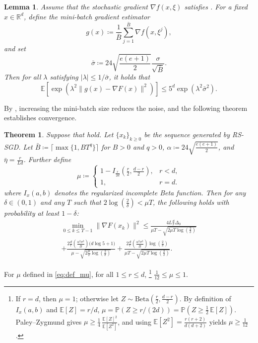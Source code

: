 \documentclass[10pt]{article}
\newtheorem{theorem}{Theorem}[section]
\newtheorem{lemma}[lemma]{Lemma}
\begin{document}
\begin{lemma}\label{lem:subgauss_minibatch}
Assume that the stochastic gradient  $\nabla f(x,\xi)$ satisfies
.
For a fixed $x \in \mathbb{R}^d$, define the mini-batch gradient estimator
\[
g(x) \coloneqq \frac{1}{\bar{B}} \sum_{j=1}^{\bar{B}} \nabla f(x,\xi^j),
\]
and set
\[
\bar{\sigma} \coloneqq 
24\sqrt{\frac{e(e+1)}{2}}\frac{\sigma}{\sqrt{\bar{B}}}.
\]
Then for all $\lambda$ satisfying $|\lambda| \le 1/\bar{\sigma}$, it holds that
\[
\mathbb{E}\!\left[
\exp\!\left(\lambda^2 \bigl\|g(x) - \nabla F(x)\bigr\|^2\right)
\right]
\le
5^d \exp\!\left(\lambda^2 \bar{\sigma}^2\right).
\]
\end{lemma}
By , increasing the mini-batch size reduces the noise, and 
the following theorem establishes convergence.

\begin{theorem}\label{thm:main_highprob}
Suppose that  hold. 
Let $\{x_k\}_{k\ge 0}$ be the sequence generated by  RS-SGD.
Let $\bar{B}\coloneqq \lceil \max\{1, BT^q\} \rceil$ for $B>0$ and $q>0$,
$\alpha \coloneqq 24\sqrt{\frac{e(e+1)}{2}}$,
and $\bar{\eta} = \frac{r}{Ld}$.
Further define
\begin{equation}
\mu \coloneqq
\begin{cases}
1 - I_{\frac{r}{2d}}\!\left(\frac{r}{2}, \frac{d-r}{2}\right), & r<d,\\
1, & r=d.
\end{cases}
\label{eq:def_mu}
\end{equation}
where $I_{x}(a,b)$ denotes the regularized incomplete Beta function.
Then for any $\delta \in (0,1)$ and any $T$ such that
$2\log\!\left(\frac{2}{\delta}\right) < \mu T$, the following holds 
with probability at least $1-\delta$: 
\begin{align*}
\min_{0\leq k \leq T-1}\|\nabla F(x_k)\|^2 
\leq 
\frac{
4L\frac{d}{r}\Delta_0
}{
\mu T - \sqrt{2\mu T \log\!\left(\frac{2}{\delta}\right)}
}
\\
+
\frac{
2\frac{d}{r}\left(\frac{\alpha^2\sigma^2}{\bar{B}}\right)
\bigl(d\log 5 + 1\bigr)
}{
\mu - \sqrt{2\frac{\mu}{T}\log\!\left(\frac{2}{\delta}\right)}
}
+
\frac{
2\frac{d}{r}\left(\frac{\alpha^2\sigma^2}{\bar{B}}\right)
\log\!\left(\frac{2}{\delta}\right)
}{
\mu T - \sqrt{2\mu T \log\!\left(\frac{2}{\delta}\right)}
}.
\end{align*}
\end{theorem}

For $\mu$ defined in \eqref{eq:def_mu}, for all $1 \le r \le d$,
\footnote{
If $r=d$, then $\mu=1$; otherwise let $Z\sim\mathrm{Beta}(\frac r2,\frac{d-r}{2})$.
By definition of $I_x(a,b)$ and $\mathbb{E}[Z]=r/d$,
$\mu=\mathbb{P}(Z\ge r/(2d))=\mathbb{P}(Z\ge \frac12\,\mathbb{E}[Z])$.
Paley--Zygmund \cite{paley1932} gives
$\mu \ge \frac14\,\frac{\mathbb{E}[Z]^2}{\mathbb{E}[Z^2]}$,
and using $\mathbb{E}[Z^2]=\frac{r(r+2)}{d(d+2)}$ yields $\mu\ge \frac{1}{12}$.
}
$\frac{1}{12} \leq \mu \le 1.$
\end{document}
